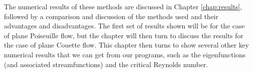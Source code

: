 The numerical results of these methods are discussed in Chapter \ref{chap:results}, followed by a comparison and discussion of the methods used and their advantages and disadvantages. The first set of results shown will be for the case of plane Poiseuille flow, but the chapter will then turn to discuss the results for the case of plane Couette flow. This chapter then turns to show several other key numerical results that we can get from our programs, such as the eigenfunctions (and associated streamfunctions) and the critical Reynolds number. 

